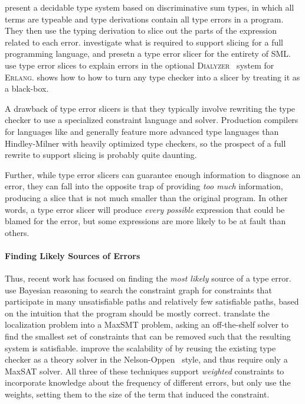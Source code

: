 \citet{Neubauer2003-xv} present a decidable type system based on
discriminative sum types, in which all terms are typeable and type
derivations contain all type errors in a program. They then use the
typing derivation to slice out the parts of the expression related to
each error.
%
\citet{Rahli2010-ps,Rahli2015-tt} investigate what is required to
support slicing for a full programming language, and presetn a type
error slicer for the entirety of \textsc{SML}.
%
\citet{Sagonas2013-bf} use type error slices to explain errors in the
optional \textsc{Dialyzer}~\citep{Lindahl2006-hz} system for
\textsc{Erlang}.
%
\citet{Schilling2011-yf} shows how to how to turn any type checker
into a slicer by treating it as a black-box.

A drawback of type error slicers is that they typically involve
rewriting the type checker to use a specialized constraint language and
solver.
%
Production compilers for languages like \ocaml and \haskell generally
feature more advanced type languages than Hindley-Milner with heavily
optimized type checkers, so the prospect of a full rewrite to support
slicing is probably quite daunting.
%

Further, while type error slicers can guarantee enough information to
diagnose an error, they can fall into the opposite trap of providing
\emph{too much} information, producing a slice that is not much smaller
than the original program.
%
In other words, a type error slicer will produce \emph{every possible}
expression that could be blamed for the error, but some expressions are
more likely to be at fault than others.

\paragraph{Finding Likely Sources of Errors}
Thus, recent work has focused on finding the \emph{most likely} source
of a type error.
%
\citeauthor{Zhang2015-yu}~\citep{Zhang2014-lv,Zhang2015-yu} use Bayesian
reasoning to search the constraint graph for constraints that
participate in many unsatisfiable paths and relatively few satisfiable
paths, based on the intuition that the program should be mostly correct.
%
\citet{Pavlinovic2014-mr,Pavlinovic2015-kh} translate the localization
problem into a MaxSMT problem, asking an off-the-shelf solver to find
the smallest set of constraints that can be removed such that the
resulting system is satisfiable.
%
\citet{Loncaric2016-uk} improve the scalability of
\citeauthor{Pavlinovic2014-mr} by reusing the existing type checker as
a theory solver in the Nelson-Oppen~\citep{Nelson1979-td}
style, and thus require only a MaxSAT solver.
%
All three of these techniques support \emph{weighted} constraints to
incorporate knowledge about the frequency of different errors,
but only \citeauthor{Pavlinovic2014-mr} use the weights, setting them to
the size of the term that induced the constraint.

